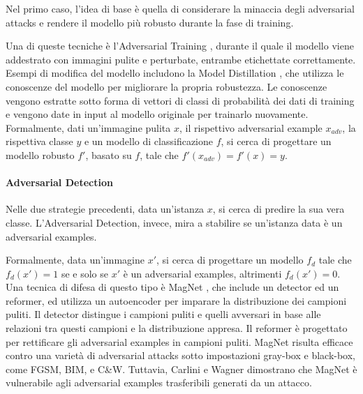 Nel primo caso, l'idea di base è quella di considerare la minaccia degli adversarial attacks e rendere il modello più robusto durante la fase di training. 

Una di queste tecniche è l'Adversarial Training \cite{goodfellow2014explaining}, durante il quale il modello viene addestrato con immagini pulite e perturbate, entrambe etichettate correttamente.
\\

Esempi di modifica del modello includono la Model Distillation \cite{papernot2015distillation}, che utilizza le conoscenze del modello per migliorare la propria robustezza. Le conoscenze vengono estratte sotto forma di vettori di classi di probabilità dei dati di training e vengono date in input al modello originale per trainarlo nuovamente.
\\

Formalmente, dati un'immagine pulita $x$, il rispettivo adversarial example $x_{adv}$, la rispettiva classe $y$ e un modello di classificazione $f$, si cerca di progettare un modello robusto $f'$, basato su $f$, tale che $f'(x_{adv}) = f'(x) = y$.


\paragraph{Adversarial Detection}
Nelle due strategie precedenti, data un'istanza $x$, si cerca di predire la sua vera classe. L'Adversarial Detection, invece, mira a stabilire se un'istanza data è un adversarial examples.

Formalmente, data un'immagine $x'$, si cerca di progettare un modello $f_d$ tale che $f_d(x') = 1$ se e solo se $x'$ è un adversarial examples, altrimenti $f_d(x') = 0$.
\\

Una tecnica di difesa di questo tipo è MagNet \cite{meng2017magnet}, che include un detector ed un reformer, ed utilizza un autoencoder per imparare la distribuzione dei campioni puliti. Il detector distingue i campioni puliti e quelli avversari in base alle relazioni tra questi campioni e la distribuzione appresa. Il reformer è progettato per rettificare gli adversarial examples in campioni puliti. MagNet risulta efficace contro una varietà di adversarial attacks sotto impostazioni gray-box e black-box, come FGSM, BIM, e C\&W. Tuttavia, Carlini e Wagner \cite{carlini2017magnet} dimostrano che MagNet è vulnerabile agli adversarial examples trasferibili generati da un attacco.